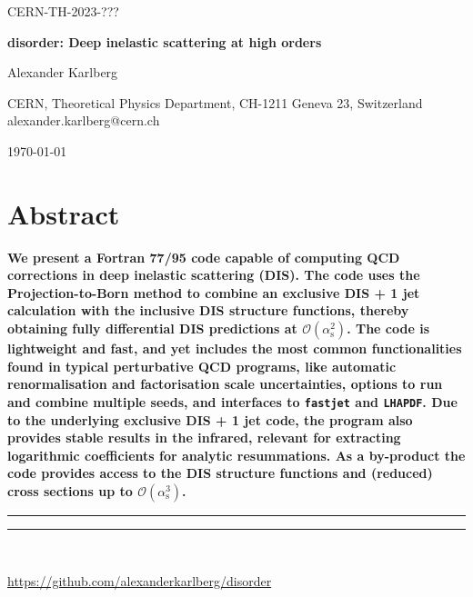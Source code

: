 \documentclass[submission, PhysCodeb]{SciPost}
\newcommand{\fastjet}{{\tt fastjet}}
\newcommand{\lhapdf}{{\tt LHAPDF}}
\newcommand{\as}{\alpha_{\mathrm{s}}}
\begin{document}
\begin{flushright}
CERN-TH-2023-???
\end{flushright}
\begin{center}{\Large \textbf{
disorder: Deep inelastic scattering at high orders\\
}}\end{center}

\begin{center}
Alexander Karlberg
\end{center}

\begin{center}
CERN, Theoretical Physics Department, CH-1211 Geneva 23, Switzerland
\\
{\small \sf alexander.karlberg@cern.ch}
\end{center}

\begin{center}
\today
\end{center}


\section*{Abstract}
{\bf
We present a Fortran 77/95 code capable of computing QCD corrections
in deep inelastic scattering (DIS). The code uses the
Projection-to-Born method to combine an exclusive DIS + 1 jet
calculation with the inclusive DIS structure functions, thereby
obtaining fully differential DIS predictions at
$\mathcal{O}(\as^2)$. The code is lightweight and fast, and yet
includes the most common functionalities found in typical perturbative
QCD programs, like automatic renormalisation and factorisation scale
uncertainties, options to run and combine multiple seeds, and
interfaces to \fastjet{} and \lhapdf{}. Due to the underlying
exclusive DIS + 1 jet code, the program also provides stable results
in the infrared, relevant for extracting logarithmic coefficients for
analytic resummations. As a by-product the code provides access
to the DIS structure functions and (reduced) cross sections up to
$\mathcal{O}(\as^3)$.}


\vspace{10pt}
\noindent\rule{\textwidth}{1pt}
\tableofcontents\thispagestyle{fancy}
\noindent\rule{\textwidth}{1pt}
\vspace{10pt}\\
\begin{center}\url{https://github.com/alexanderkarlberg/disorder}\end{center}
\newpage
\end{document}

